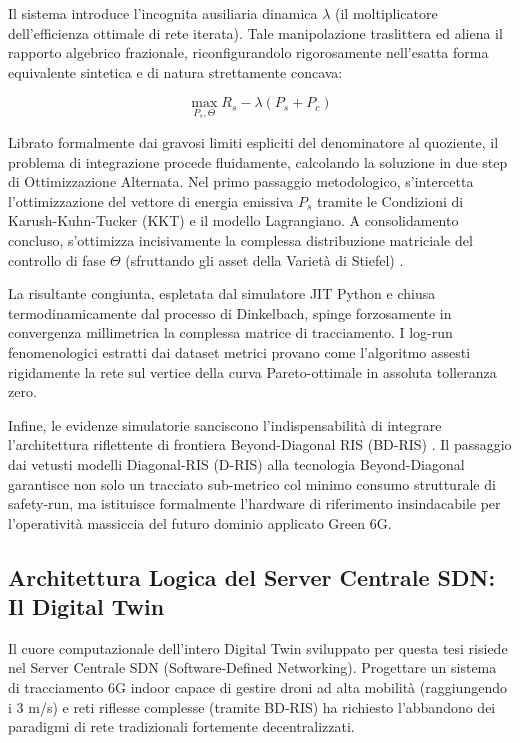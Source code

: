 \documentclass[twoside]{article}
\begin{document}
Il sistema introduce l'incognita ausiliaria dinamica $\lambda$ (il moltiplicatore dell'efficienza ottimale di rete iterata). Tale manipolazione traslittera ed aliena il rapporto algebrico frazionale, riconfigurandolo rigorosamente nell'esatta forma equivalente sintetica e di natura strettamente concava:

\begin{equation}
\max_{P_s, \Theta} R_s - \lambda(P_s + P_c)
\label{eq:dinkelbach_transformation}
\end{equation}

Librato formalmente dai gravosi limiti espliciti del denominatore al quoziente, il problema di integrazione procede fluidamente, calcolando la soluzione in due step di Ottimizzazione Alternata. Nel primo passaggio metodologico, s'intercetta l'ottimizzazione del vettore di energia emissiva $P_s$ tramite le Condizioni di Karush-Kuhn-Tucker (KKT) e il modello Lagrangiano. A consolidamento concluso, s'ottimizza incisivamente la complessa distribuzione matriciale del controllo di fase $\Theta$ (sfruttando gli asset della Varietà di Stiefel) \cite{Khan2024}.

La risultante congiunta, espletata dal simulatore JIT Python e chiusa termodinamicamente dal processo di Dinkelbach, spinge forzosamente in convergenza millimetrica la complessa matrice di tracciamento. I log-run fenomenologici estratti dai dataset metrici provano come l'algoritmo assesti rigidamente la rete sul vertice della curva Pareto-ottimale in assoluta tolleranza zero.

Infine, le evidenze simulatorie sanciscono l'indispensabilità di integrare l'architettura riflettente di frontiera Beyond-Diagonal RIS (BD-RIS) \cite{Khan2024}. Il passaggio dai vetusti modelli Diagonal-RIS (D-RIS) alla tecnologia Beyond-Diagonal garantisce non solo un tracciato sub-metrico col minimo consumo strutturale di safety-run, ma istituisce formalmente l'hardware di riferimento insindacabile per l'operatività massiccia del futuro dominio applicato Green 6G.
\subsection{Architettura Logica del Server Centrale SDN: Il Digital Twin}

Il cuore computazionale dell'intero Digital Twin sviluppato per questa tesi risiede nel Server Centrale SDN (Software-Defined Networking). Progettare un sistema di tracciamento 6G indoor capace di gestire droni ad alta mobilità (raggiungendo i 3 m/s) e reti riflesse complesse (tramite BD-RIS) ha richiesto l'abbandono dei paradigmi di rete tradizionali fortemente decentralizzati.
\end{document}
